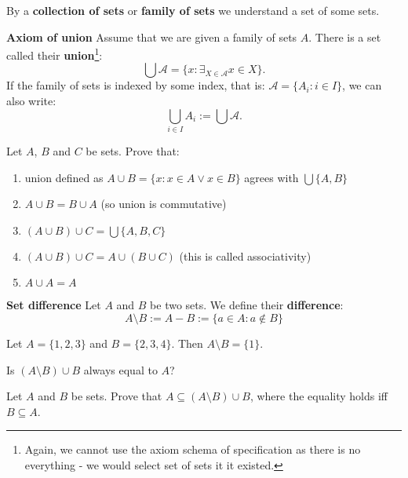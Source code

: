 \begin{definition}
  By a \textbf{collection of sets} or \textbf{family of sets} we understand a set of some sets.
\end{definition}

\begin{definition}
  \textbf{Axiom of union} Assume that we are given a family of sets $A$. There is a set called their \textbf{union}\footnote{Again, we cannot use the axiom schema of specification as there is no everything - we would select set of sets it it existed.}:
  $$\bigcup \mathcal A = \{x : \exists_{X\in \mathcal A} x\in X\}.$$
  If the family of sets is indexed by some index, that is: $\mathcal A = \{A_i : i\in I\}$, we can also write:
  $$\bigcup_{i\in I} A_i := \bigcup \mathcal A.$$
\end{definition}

\begin{exercise}
  Let $A$, $B$ and $C$ be sets. Prove that:
  \begin{enumerate}
    \item union defined as $A\cup B=\{x : x\in A \vee x\in B\}$ agrees with $\bigcup \{A, B\}$
    \item $A\cup B = B\cup A$ (so union is commutative)
    \item $(A\cup B)\cup C = \bigcup \{A,B,C\}$
    \item $(A\cup B)\cup C = A\cup (B\cup C)$ (this is called associativity)
    \item $A\cup A=A$
  \end{enumerate}
\end{exercise}

\begin{definition}
  \textbf{Set difference} Let $A$ and $B$ be two sets. We define their \textbf{difference}:
  $$A\setminus B := A-B := \{a \in A : a\notin B\}$$
\end{definition}

\begin{example}
  Let $A=\{1,2,3\}$ and $B=\{2,3,4\}$. Then $A\setminus B = \{1\}$.
\end{example}

\begin{exercise}
  Is $(A\setminus B) \cup B$ always equal to $A$?
\end{exercise}

\begin{exercise}
  Let $A$ and $B$ be sets. Prove that $A\subseteq (A\setminus B)\cup B$, where the equality holds iff $B\subseteq A$.
\end{exercise}


